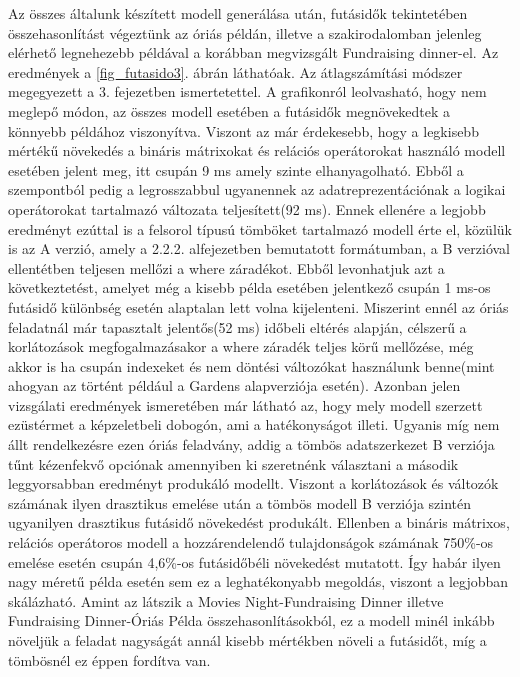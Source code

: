 \documentclass[12pt,a4paper,twoside, openright]{report}
\begin{document}
    Az összes általunk készített modell generálása után, futásidők tekintetében összehasonlítást végeztünk az óriás példán, illetve a szakirodalomban jelenleg elérhető legnehezebb példával a korábban megvizsgált Fundraising dinner-el. Az eredmények a \ref{fig_futasido3}. ábrán láthatóak. Az átlagszámítási módszer megegyezett a  3. fejezetben ismertetettel. A grafikonról leolvasható, hogy nem meglepő módon, az összes modell  esetében a futásidők megnövekedtek a könnyebb példához viszonyítva. Viszont az már érdekesebb, hogy a legkisebb mértékű növekedés a bináris mátrixokat és relációs operátorokat használó modell esetében jelent meg, itt csupán 9 ms amely szinte elhanyagolható. Ebből a szempontból pedig a legrosszabbul ugyanennek az adatreprezentációnak a logikai operátorokat tartalmazó változata teljesített(92 ms). Ennek ellenére a legjobb eredményt ezúttal is a felsorol típusú tömböket tartalmazó modell érte el, közülük is az A verzió, amely a 2.2.2. alfejezetben bemutatott formátumban, a B verzióval ellentétben teljesen mellőzi a where záradékot. Ebből levonhatjuk azt a következtetést, amelyet még a kisebb példa esetében jelentkező csupán 1 ms-os futásidő különbség esetén alaptalan lett volna kijelenteni. Miszerint ennél az óriás feladatnál már tapasztalt jelentős(52 ms) időbeli eltérés alapján, célszerű a korlátozások megfogalmazásakor a where záradék teljes körű mellőzése, még akkor is ha csupán indexeket és nem döntési változókat használunk benne(mint ahogyan az történt például a Gardens alapverziója esetén). Azonban jelen vizsgálati eredmények ismeretében már látható az, hogy mely modell szerzett ezüstérmet a képzeletbeli dobogón, ami a hatékonyságot illeti. Ugyanis míg nem állt rendelkezésre ezen óriás feladvány, addig a tömbös adatszerkezet B verziója tűnt kézenfekvő opciónak amennyiben ki szeretnénk választani a második leggyorsabban eredményt produkáló modellt. Viszont a korlátozások és változók számának ilyen drasztikus emelése után a tömbös modell B verziója szintén ugyanilyen drasztikus futásidő növekedést produkált. Ellenben a bináris mátrixos, relációs operátoros modell a hozzárendelendő tulajdonságok számának 750\%-os emelése esetén csupán 4,6\%-os futásidőbéli növekedést mutatott. Így habár ilyen nagy méretű példa esetén sem ez a leghatékonyabb megoldás, viszont a legjobban skálázható. Amint az látszik a Movies Night-Fundraising Dinner illetve Fundraising Dinner-Óriás Példa összehasonlításokból, ez a modell minél inkább növeljük a feladat nagyságát annál kisebb mértékben növeli a futásidőt, míg a tömbösnél ez éppen fordítva van.
    
\end{document}
